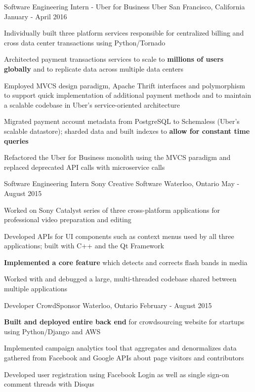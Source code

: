 \begin{cventries}
  \cventry
    {Software Engineering Intern - Uber for Business}
    {Uber}
    {San Francisco, California}
    {January - April 2016}
    {
      \begin{cvitems}
      \item Individually built three platform services responsible for centralized billing and cross data center transactions using Python/Tornado
      \item Architected payment transactions services to scale to \textbf{millions of users globally} and to replicate data across multiple data centers
      \item Employed MVCS design paradigm, Apache Thrift interfaces and polymorphism to support quick implementation of additional payment methods and to maintain a scalable codebase in Uber's service-oriented architecture
      \item Migrated payment account metadata from PostgreSQL to Schemaless (Uber's scalable datastore); sharded data and built indexes to \textbf{allow for constant time queries}
      \item Refactored the Uber for Business monolith using the MVCS paradigm and replaced deprecated API calls with microservice calls
      \end{cvitems}
    }
  \cventry
    {Software Engineering Intern}
    {Sony Creative Software}
    {Waterloo, Ontario}
    {May - August 2015}
    {
      \begin{cvitems}
        \item Worked on Sony Catalyst series of three cross-platform applications for professional video preparation and editing
        \item Developed APIs for UI components such as context menus used by all three applications; built with C++ and the Qt Framework
        \item \textbf{Implemented a core feature} which detects and corrects flash bands in media
        \item Worked with and debugged a large, multi-threaded codebase shared between multiple applications
      \end{cvitems}
    }
  \cventry
    {Developer}
    {CrowdSponsor}
    {Waterloo, Ontario}
    {February - August 2015}
    {
      \begin{cvitems}
      \item \textbf{Built and deployed entire back end} for crowdsourcing website for startups using Python/Django and AWS
        \item Implemented campaign analytics tool that aggregates and denormalizes data gathered from Facebook and Google APIs about page visitors and contributors
        \item Developed user registration using Facebook Login as well as single sign-on comment threads with Disqus
      \end{cvitems}
    }
\end{cventries}
